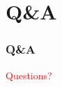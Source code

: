 \documentclass{beamer}
\newcommand{\astitle}{nix}
\begin{document}
\section{Q\&A}
\renewcommand{\astitle}{Q\&A}
\begin{frame}
\frametitle{\astitle}
\vfill
\centering
\begin{Huge}\textcolor{red}{Questions?}\end{Huge}
\vfill
\end{frame}
\end{document}
